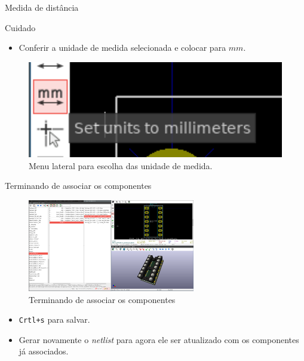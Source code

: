 \documentclass{beamer}
\begin{document}
\begin{frame}{Medida de distância}
	\begin{block}{Cuidado}
		\begin{itemize}
			\item Conferir a unidade de medida selecionada e colocar para $mm$.
		\end{itemize}
	\end{block}
	\begin{figure}
		\centering
		\includegraphics[width=1\textwidth]{Imagens/22_cuidado_unidade.png}
		\caption{Menu lateral para escolha das unidade de medida.}
	\end{figure}
\end{frame}

\begin{frame}{Terminando de associar os componentes}
	\begin{figure}
		\centering
		\includegraphics[width=0.65\textwidth]{Imagens/23_terminando_associar.png}
		\caption{Terminando de associar os componentes}
	\end{figure}
	\pause
	\begin{itemize}
		\item \texttt{Crtl+s} para salvar.
		\item Gerar novamente o \textit{netlist} para agora ele ser atualizado com os componentes já associados.
	\end{itemize}
\end{frame}
\end{document}
